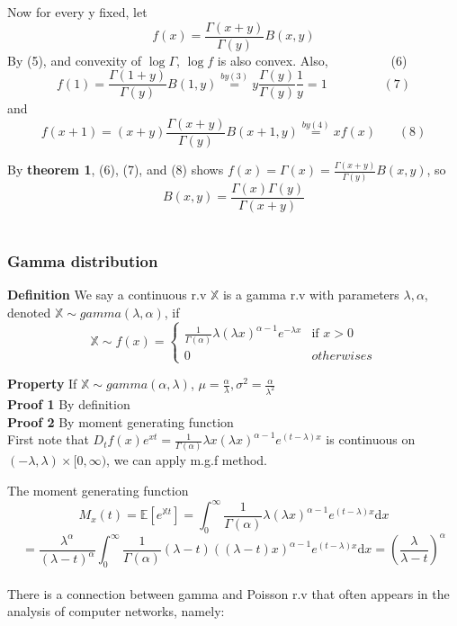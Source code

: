 \documentclass[a4paper,12pt]{article}
\begin{document}
Now for every y fixed, let $$f(x) = \frac{\Gamma(x+y)}{\Gamma(y)}B(x, y)$$
By (5), and convexity of $\log \Gamma$, $\log f$ is also convex. Also,\ \ \ \ \ \ \ \ \ \ (6)
$$f(1) = \frac{\Gamma(1+y)}{\Gamma(y)}B(1, y) \stackrel{by (3)}{=} y\frac{\Gamma(y)}{\Gamma(y)}\frac{1}{y} = 1\ \ \ \ \ \ \ \ \ \ \ \ \ \ \ \ \ \ \ \ (7)$$
and$$f(x+1) = (x+y)\frac{\Gamma(x+y)}{\Gamma(y)}B(x+1, y) \stackrel{by (4)}{=} xf(x) \ \ \ \ \ \ \ \ (8)$$

By \textbf{theorem 1}, (6), (7), and (8) shows $f(x) = \Gamma(x) = \frac{\Gamma(x+y)}{\Gamma(y)}B(x, y)$, so $$B(x, y) = \frac{\Gamma(x)\Gamma(y)}{\Gamma(x+y)}$$\\

\subsubsection*{Gamma distribution}
\textbf{Definition} We say a continuous r.v $\mathbb{X}$ is a gamma r.v with parameters $\lambda, \alpha$, denoted $\mathbb{X} \sim gamma(\lambda, \alpha)$, if
$$
 \mathbb{X} \sim f(x) =
  \begin{cases}
   \frac{1}{\Gamma(\alpha)}\lambda(\lambda x)^{\alpha-1}e^{-\lambda x} & \text{if } x > 0 \\
   0       & otherwises
  \end{cases}
$$

\textbf{Property} If $\mathbb{X} \sim gamma(\alpha, \lambda)$, $\mu = \frac{\alpha}{\lambda}, \sigma^2 = \frac{\alpha}{\lambda^2}$\\

\textbf{Proof 1} By definition\\

\textbf{Proof 2} By moment generating function\\
First note that $D_t f(x)e^{xt} = \frac{1}{\Gamma(\alpha)}\lambda x(\lambda x)^{\alpha-1}e^{(t-\lambda) x}$ is continuous on $(-\lambda, \lambda ) \times [0, \infty)$, we can apply m.g.f method.

The moment generating function
$$M_x(t) = \mathbb{E}[e^{\mathbb{X}t}] = \int_0^\infty \frac{1}{\Gamma(\alpha)} \lambda (\lambda x)^{\alpha-1} e^{(t-\lambda)x} \mathrm{d}x $$
$$= \frac{\lambda^\alpha}{(\lambda-t)^\alpha}\int_0^\infty \frac{1}{\Gamma(\alpha)} (\lambda-t) ((\lambda-t) x)^{\alpha-1} e^{(t-\lambda)x} \mathrm{d}x = (\frac{\lambda}{\lambda-t})^\alpha$$\\

There is a connection between gamma and Poisson r.v that often appears in the analysis of computer networks, namely:\\
\end{document}

